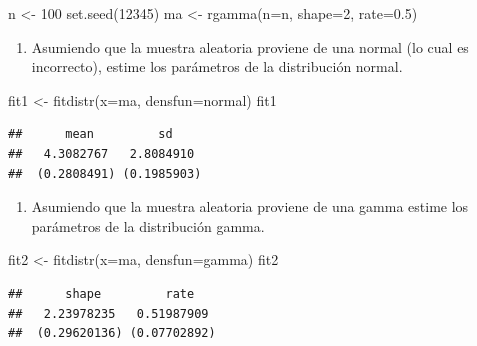 \documentclass[
]{book}
\makeatletter
\newenvironment{Shaded}{\begin{snugshade}}{\end{snugshade}}
\newcommand{\AttributeTok}[1]{\textcolor[rgb]{0.77,0.63,0.00}{#1}}
\newcommand{\DecValTok}[1]{\textcolor[rgb]{0.00,0.00,0.81}{#1}}
\newcommand{\FloatTok}[1]{\textcolor[rgb]{0.00,0.00,0.81}{#1}}
\newcommand{\FunctionTok}[1]{\textcolor[rgb]{0.00,0.00,0.00}{#1}}
\newcommand{\NormalTok}[1]{#1}
\newcommand{\OtherTok}[1]{\textcolor[rgb]{0.56,0.35,0.01}{#1}}
\newcommand{\StringTok}[1]{\textcolor[rgb]{0.31,0.60,0.02}{#1}}
\providecommand{\tightlist}{%
  \setlength{\itemsep}{0pt}\setlength{\parskip}{0pt}}
\newenvironment{kframe}{%
\medskip{}
\setlength{\fboxsep}{.8em}
 \def\at@end@of@kframe{}%
 \ifinner\ifhmode%
  \def\at@end@of@kframe{\end{minipage}}%
  \begin{minipage}{\columnwidth}%
 \fi\fi%
 \def\FrameCommand##1{\hskip\@totalleftmargin \hskip-\fboxsep
 \colorbox{shadecolor}{##1}\hskip-\fboxsep
     \hskip-\linewidth \hskip-\@totalleftmargin \hskip\columnwidth}%
 \MakeFramed {\advance\hsize-\width
   \@totalleftmargin\z@ \linewidth\hsize
   \@setminipage}}%
 {\par\unskip\endMakeFramed%
 \at@end@of@kframe}
\renewenvironment{Shaded}{\begin{kframe}}{\end{kframe}}
\makeatother
\begin{document}
\begin{Shaded}
\begin{Highlighting}[]
\NormalTok{n }\OtherTok{\textless{}{-}} \DecValTok{100}
\FunctionTok{set.seed}\NormalTok{(}\DecValTok{12345}\NormalTok{)}
\NormalTok{ma }\OtherTok{\textless{}{-}} \FunctionTok{rgamma}\NormalTok{(}\AttributeTok{n=}\NormalTok{n, }\AttributeTok{shape=}\DecValTok{2}\NormalTok{, }\AttributeTok{rate=}\FloatTok{0.5}\NormalTok{)}
\end{Highlighting}
\end{Shaded}

\begin{enumerate}
\def\labelenumi{\arabic{enumi})}
\setcounter{enumi}{1}
\tightlist
\item
  Asumiendo que la muestra aleatoria proviene de una normal (lo cual es incorrecto), estime los parámetros de la distribución normal.
\end{enumerate}

\begin{Shaded}
\begin{Highlighting}[]
\NormalTok{fit1 }\OtherTok{\textless{}{-}} \FunctionTok{fitdistr}\NormalTok{(}\AttributeTok{x=}\NormalTok{ma, }\AttributeTok{densfun=}\StringTok{\textquotesingle{}normal\textquotesingle{}}\NormalTok{)}
\NormalTok{fit1}
\end{Highlighting}
\end{Shaded}

\begin{verbatim}
##      mean         sd    
##   4.3082767   2.8084910 
##  (0.2808491) (0.1985903)
\end{verbatim}

\begin{enumerate}
\def\labelenumi{\arabic{enumi})}
\setcounter{enumi}{2}
\tightlist
\item
  Asumiendo que la muestra aleatoria proviene de una gamma estime los parámetros de la distribución gamma.
\end{enumerate}

\begin{Shaded}
\begin{Highlighting}[]
\NormalTok{fit2 }\OtherTok{\textless{}{-}} \FunctionTok{fitdistr}\NormalTok{(}\AttributeTok{x=}\NormalTok{ma, }\AttributeTok{densfun=}\StringTok{\textquotesingle{}gamma\textquotesingle{}}\NormalTok{)}
\NormalTok{fit2}
\end{Highlighting}
\end{Shaded}

\begin{verbatim}
##      shape         rate   
##   2.23978235   0.51987909 
##  (0.29620136) (0.07702892)
\end{verbatim}
\end{document}
